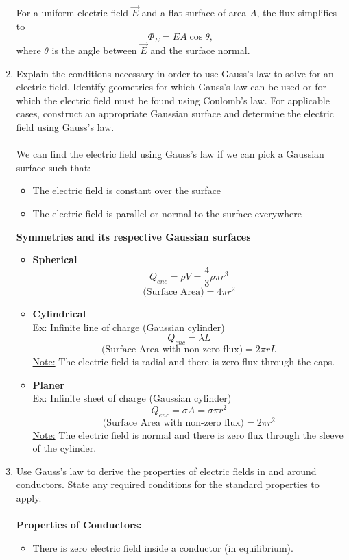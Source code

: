 \documentclass[12pt]{article}
\begin{document}
\begin{enumerate}
For a uniform electric field $\vec{E}$ and a flat surface of area $A$, the flux simplifies to
\[
\Phi_E = EA \cos\theta,
\]
where $\theta$ is the angle between $\vec{E}$ and the surface normal.
    \item Explain the conditions necessary in order to use Gauss's law to solve for an electric field. Identify geometries for which Gauss's law can be used or for which the electric field must be found using Coulomb's law. For applicable cases, construct an appropriate Gaussian surface and determine the electric field using Gauss's law.\\\\
    We can find the electric field using Gauss's law if we can pick a Gaussian surface such that:
    \begin{itemize}
        \item The electric field is constant over the surface
        \item The electric field is parallel or normal to the surface everywhere
    \end{itemize}
\textbf{Symmetries and its respective Gaussian surfaces}
\begin{itemize}
    \item \textbf{Spherical}
    \[Q_{enc}=\rho V=\frac{4}{3}\rho \pi r^3\]
    \[\text{(Surface Area)}=4\pi r^2\]
    \item \textbf{Cylindrical}\\
    Ex: Infinite line of charge (Gaussian cylinder)
\[Q_{enc}=\lambda L\]
\[\text{(Surface Area with non-zero flux)}=2\pi r L\]
\underline{Note:} The electric field is radial and there is zero flux through the caps.
    \item \textbf{Planer}\\
    Ex: Infinite sheet of charge (Gaussian cylinder)
    \[Q_{enc}=\sigma A=\sigma \pi r^2\]
    \[\text{(Surface Area with non-zero flux)}=2\pi r^2\]
    \underline{Note:} The electric field is normal and there is zero flux through the sleeve of the cylinder.
\end{itemize}
    \item Use Gauss's law to derive the properties of electric fields in and around conductors. State any required conditions for the standard properties to apply.\\\\
\textbf{Properties of Conductors:}
\begin{itemize}
    \item There is zero electric field inside a conductor (in equilibrium).

\end{itemize}
\end{enumerate}
\end{document}
